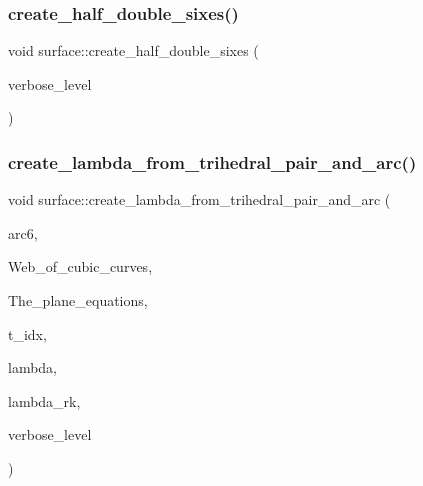 \mbox{\label{classsurface_abd6272010fb4ce46c941bb3e99c38799}} 
\subsubsection{\texorpdfstring{create\+\_\+half\+\_\+double\+\_\+sixes()}{create\_half\_double\_sixes()}}
{\footnotesize\ttfamily void surface\+::create\+\_\+half\+\_\+double\+\_\+sixes (\begin{DoxyParamCaption}\item[{\mbox{\hyperlink{galois_8h_a09fddde158a3a20bd2dcadb609de11dc}{I\+NT}}}]{verbose\+\_\+level }\end{DoxyParamCaption})}

\mbox{\label{classsurface_adb7f42b89cea8b8b3b63e0b02f925e59}} 
\subsubsection{\texorpdfstring{create\+\_\+lambda\+\_\+from\+\_\+trihedral\+\_\+pair\+\_\+and\+\_\+arc()}{create\_lambda\_from\_trihedral\_pair\_and\_arc()}}
{\footnotesize\ttfamily void surface\+::create\+\_\+lambda\+\_\+from\+\_\+trihedral\+\_\+pair\+\_\+and\+\_\+arc (\begin{DoxyParamCaption}\item[{\mbox{\hyperlink{galois_8h_a09fddde158a3a20bd2dcadb609de11dc}{I\+NT}} $\ast$}]{arc6,  }\item[{\mbox{\hyperlink{galois_8h_a09fddde158a3a20bd2dcadb609de11dc}{I\+NT}} $\ast$}]{Web\+\_\+of\+\_\+cubic\+\_\+curves,  }\item[{\mbox{\hyperlink{galois_8h_a09fddde158a3a20bd2dcadb609de11dc}{I\+NT}} $\ast$}]{The\+\_\+plane\+\_\+equations,  }\item[{\mbox{\hyperlink{galois_8h_a09fddde158a3a20bd2dcadb609de11dc}{I\+NT}}}]{t\+\_\+idx,  }\item[{\mbox{\hyperlink{galois_8h_a09fddde158a3a20bd2dcadb609de11dc}{I\+NT}} \&}]{lambda,  }\item[{\mbox{\hyperlink{galois_8h_a09fddde158a3a20bd2dcadb609de11dc}{I\+NT}} \&}]{lambda\+\_\+rk,  }\item[{\mbox{\hyperlink{galois_8h_a09fddde158a3a20bd2dcadb609de11dc}{I\+NT}}}]{verbose\+\_\+level }\end{DoxyParamCaption})}


